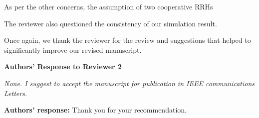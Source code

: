 \documentclass[onecolumn, 11pt, draftclsnofoot]{IEEEtran}
\begin{document}
As per the other concerns, the assumption of two cooperative RRHs

The reviewer also questioned the consistency of our simulation result.

Once again, we thank the reviewer for the review and suggestions that helped to
significantly improve our revised manuscript.



\newpage
\begin{center}
{\LARGE \textbf{Authors' Response to Reviewer 2}}
\end{center}

\noindent
\emph{None. I suggest to accept the manuscript for publication in IEEE
communications Letters.}

\noindent \textbf{Authors' response:}
Thank you for your recommendation.

\vspace{0.5cm}



\end{document}
